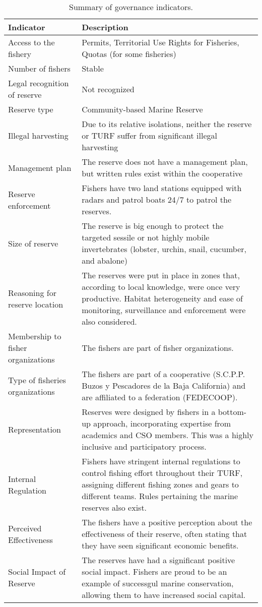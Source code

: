 \documentclass[12pt,]{article}
\begin{document}
\begin{table}

\caption{\label{tab:unnamed-chunk-6}Summary of governance indicators.}
\centering
\begin{tabular}[t]{l|>{\raggedright\arraybackslash}p{9cm}}
\hline
Indicator & Description\\
\hline
Access to the fishery & Permits, Territorial Use Rights for Fisheries, Quotas (for some fisheries)\\
\hline
Number of fishers & Stable\\
\hline
Legal recognition of reserve & Not recognized\\
\hline
Reserve type & Community-based Marine Reserve\\
\hline
Illegal harvesting & Due to its relative isolations, neither the reserve or TURF suffer from significant illegal harvesting\\
\hline
Management plan & The reserve does not have a management plan, but written rules exist within the cooperative\\
\hline
Reserve enforcement & Fishers have two land stations equipped with radars and patrol boats 24/7 to patrol the reserves.\\
\hline
Size of reserve & The reserve is big enough to protect the targeted sessile or not highly mobile invertebrates (lobster, urchin, snail, cucumber, and abalone)\\
\hline
Reasoning for reserve location & The reserves were put in place in zones that, according to local knowledge, were once very productive. Habitat heterogeneity and ease of monitoring, surveillance and enforcement were also considered.\\
\hline
Membership to fisher organizations & The fishers are part of fisher organizations.\\
\hline
Type of fisheries organizations & The fishers are part of a cooperative (S.C.P.P. Buzos y Pescadores de la Baja California) and are affiliated to a federation (FEDECOOP).\\
\hline
Representation & Reserves were designed by fishers in a bottom-up approach, incorporating expertise from academics and CSO members. This was a highly inclusive and participatory process.\\
\hline
Internal Regulation & Fishers have stringent internal regulations to control fishing effort throughout their TURF, assigning different fishing zones and gears to different teams. Rules pertaining the marine reserves also exist.\\
\hline
Perceived Effectiveness & The fishers have a positive perception about the effectiveness of their reserve, often stating that they have seen significant economic benefits.\\
\hline
Social Impact of Reserve & The reserves have had a significant positive social impact. Fishers are proud to be an example of successgul marine conservation, allowing them to have increased social capital.\\
\hline
\end{tabular}
\end{table}
\end{document}

